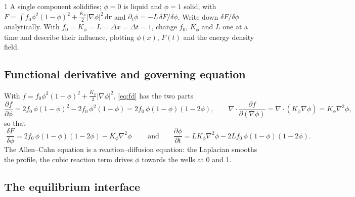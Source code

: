 \documentclass[11pt,a4paper]{article}
\numberwithin{equation}{section}
\theoremstyle{remark}
\newcommand{\fd}[2]{\frac{\delta #1}{\delta #2}}
\begin{document}
\begin{task}{1}
  A single component solidifies; $\phi = 0$ is liquid and $\phi = 1$ solid, with
  $F = \int f_0\phi^2(1-\phi)^2 + \tfrac{K_\phi}{2}|\nabla\phi|^2\,\mathrm{d}\bm{r}$ and
  $\partial_t\phi = -L\,\delta F/\delta\phi$. Write down $\delta F/\delta\phi$ analytically. With
  $f_0 = K_\phi = L = \Delta x = \Delta t = 1$, change $f_0$, $K_\phi$ and $L$ one at a time and
  describe their influence, plotting $\phi(x)$, $F(t)$ and the energy density field.
\end{task}

\subsection{Functional derivative and governing equation}\label{sec:derivative}

With $f = f_0\phi^2(1-\phi)^2 + \tfrac{K_\phi}{2}|\nabla\phi|^2$, \cref{eq:fd} has the two parts
\begin{equation}\label{eq:parts}
  \frac{\partial f}{\partial\phi} = 2f_0\,\phi(1-\phi)^2 - 2f_0\,\phi^2(1-\phi)
  = 2f_0\,\phi(1-\phi)(1-2\phi),
  \qquad
  \nabla\cdot\frac{\partial f}{\partial(\nabla\phi)} = \nabla\cdot(K_\phi\nabla\phi) = K_\phi\nabla^2\phi,
\end{equation}
so that
\begin{equation}\label{eq:dFdphi}
  \boxed{\;\fd{F}{\phi} = 2f_0\,\phi(1-\phi)(1-2\phi) - K_\phi\nabla^2\phi\;}
  \qquad\text{and}\qquad
  \frac{\partial\phi}{\partial t} = LK_\phi\nabla^2\phi - 2Lf_0\,\phi(1-\phi)(1-2\phi).
\end{equation}
The Allen--Cahn equation is a reaction--diffusion equation: the Laplacian smooths the profile, the
cubic reaction term drives $\phi$ towards the wells at 0 and 1.

\subsection{The equilibrium interface}\label{sec:eqprofile}
\end{document}
